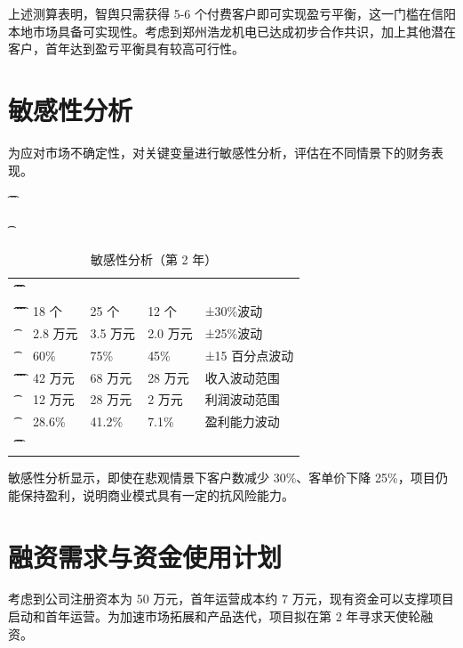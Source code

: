 上述测算表明，智舆只需获得 5-6 个付费客户即可实现盈亏平衡，这一门槛在信阳本地市场具备可实现性。考虑到郑州浩龙机电已达成初步合作共识，加上其他潜在客户，首年达到盈亏平衡具有较高可行性。

\section{敏感性分析}

为应对市场不确定性，对关键变量进行敏感性分析，评估在不同情景下的财务表现。

\begin{table}[htbp]
	\t\centering
	\t\caption{敏感性分析（第 2 年）}
	\t\begin{tabularx}{\textwidth}{|L{3.5cm}C{2.2cm}C{2.2cm}C{2.2cm}Y|}
		\t\t\toprule
		\t\t{} &  &  &  &  \\
		\t\t\midrule
		\t\t{}
		\t{}        & 18 个           & 25 个           & 12 个           & ±30\%波动      \\
		\t{}        & 2.8 万元         & 3.5 万元         & 2.0 万元         & ±25\%波动      \\
		\t{}          & 60\%           & 75\%           & 45\%           & ±15 百分点波动    \\
		\t\t\midrule
		\t\t{}
		\t{}         & 42 万元          & 68 万元          & 28 万元          & 收入波动范围       \\
		\t{}          & 12 万元          & 28 万元          & 2 万元           & 利润波动范围       \\
		\t{}          & 28.6\%         & 41.2\%         & 7.1\%          & 盈利能力波动       \\
		\t\t\bottomrule
		\t\end{tabularx}
\end{table}

敏感性分析显示，即使在悲观情景下客户数减少 30\%、客单价下降 25\%，项目仍能保持盈利，说明商业模式具有一定的抗风险能力。

\section{融资需求与资金使用计划}

考虑到公司注册资本为 50 万元，首年运营成本约 7 万元，现有资金可以支撑项目启动和首年运营。为加速市场拓展和产品迭代，项目拟在第 2 年寻求天使轮融资。

